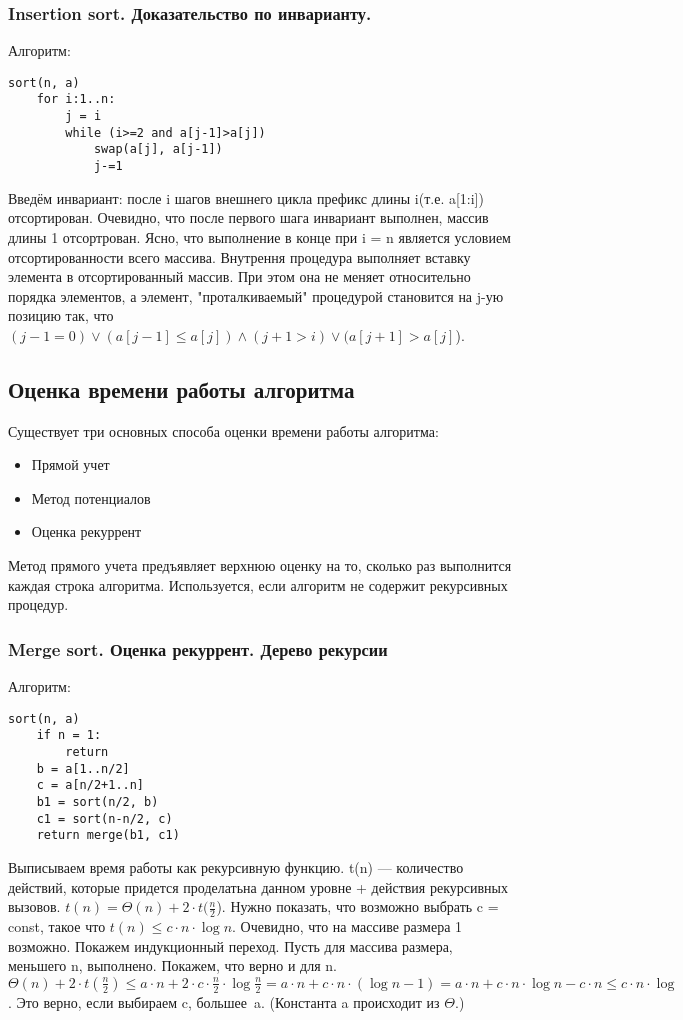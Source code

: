 \documentclass[a4paper, 12pt]{article}
\begin{document}
\subsubsection*{Insertion sort. Доказательство по инварианту.}
Алгоритм:
\begin{lstlisting}[firstnumber=1]
sort(n, a)
    for i:1..n:
        j = i
        while (i>=2 and a[j-1]>a[j])
            swap(a[j], a[j-1])
            j-=1
\end{lstlisting}

Введём инвариант: после i шагов внешнего цикла префикс длины i(т.е. a[1:i]) отсортирован. Очевидно, что после первого шага инвариант выполнен, массив длины 1 отсортрован. Ясно, что выполнение в конце при i = n является условием отсортированности всего массива. Внутрення процедура выполняет вставку элемента в отсортированный массив. При этом она не меняет относительно порядка элементов, а элемент, "проталкиваемый" процедурой становится на j-ую позицию так, что $(j-1=0) \lor (a[j-1] \leqslant a[j]) \land (j+1 > i) \lor (a[j+1]>a[j]$).

\subsection*{Оценка времени работы алгоритма}

Существует три основных способа оценки времени работы алгоритма:
\begin{itemize}
    \item Прямой учет
    \item Метод потенциалов
    \item Оценка рекуррент
\end{itemize}

Метод прямого учета предъявляет верхнюю оценку на то, сколько раз выполнится каждая строка алгоритма. Используется, если алгоритм не содержит рекурсивных процедур.


\subsubsection*{Merge sort. Оценка рекуррент. Дерево рекурсии}
Алгоритм:
\begin{lstlisting}[firstnumber=1]
sort(n, a)
    if n = 1:
        return
    b = a[1..n/2]
    c = a[n/2+1..n]
    b1 = sort(n/2, b)
    c1 = sort(n-n/2, c)
    return merge(b1, c1)
\end{lstlisting}

Выписываем время работы как рекурсивную функцию. t(n) --- количество действий, которые придется проделатьна данном уровне + действия рекурсивных вызовов. $t(n) = \Theta(n) + 2 \cdot t (\frac{n}{2}$).
Нужно показать, что возможно выбрать c = const, такое что $t(n) \leqslant c \cdot n\cdot \log n$. Очевидно, что на массиве размера 1 возможно. Покажем индукционный переход. Пусть для массива размера, меньшего n, выполнено. Покажем, что верно и для n.
 $\Theta(n) + 2 \cdot t (\frac{n}{2}) \leqslant a\cdot n+2 \cdot c \cdot \frac{n}{2} \cdot \log{\frac{n}{2}}= a\cdot n +c \cdot n \cdot (\log n - 1) = a \cdot n + c \cdot n \cdot \log n - c \cdot n \leqslant c \cdot n \cdot \log$. Это верно, если выбираем c, большее~a.
(Константа a происходит из $\Theta$.)
\end{document}
